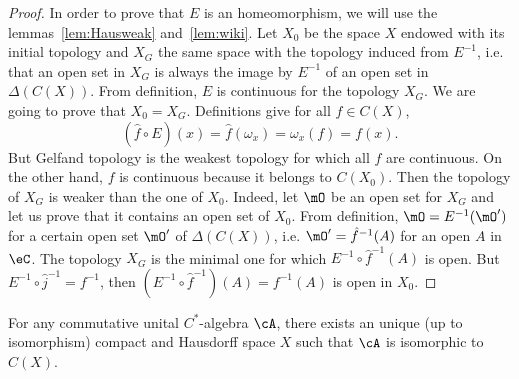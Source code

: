 \begin{proof}
	In order to prove that $E$ is an homeomorphism, we will use the lemmas~\ref{lem:Hausweak} and~\ref{lem:wiki}. Let $X_0$ be the space $X$ endowed with its initial topology and $X_G$ the same space with the topology induced from $E^{-1}$, i.e. that an open set in $X_G$ is always the image by $E^{-1}$ of an open set in $\Delta(C(X))$. From definition, $E$ is continuous for the topology $X_G$. We are going to prove that $X_0=X_G$. Definitions give for all $f\in C(X)$,
	\[
		(\hat f\circ E)(x)=\hat f(\omega_x)=\omega_x(f)=f(x).
	\]
	But Gelfand topology is the weakest topology for which all $f$ are continuous. On the other hand, $f$ is continuous because it belongs to $C(X_0)$. Then the topology of $X_G$ is weaker than the one of $X_0$. Indeed, let $\mO$ be an open set for $X_G$ and let us prove that it contains an open set of $X_0$. From definition, $\mO=E^{-1}(\mO')$ for a certain open set $\mO'$ of $\Delta(C(X))$, i.e. $\mO'=\hat f^{-1}(A)$ for an open $A$ in $\eC$. The topology $X_G$ is the minimal one for which $E^{-1}\circ\hat f^{-1}(A)$ is open. But $E^{-1}\circ\hat j^{-1}=f^{-1}$, then $(E^{-1}\circ\hat f^{-1})(A)=f^{-1}(A)$ is open in $X_0$.
\end{proof}


\begin{theorem}    

	For any commutative unital $C^*$-algebra $\cA$, there exists an unique (up to isomorphism) compact and Hausdorff space $X$ such that  $\cA$ is isomorphic to $C(X)$.
	\label{thoGelfand}
\end{theorem}

